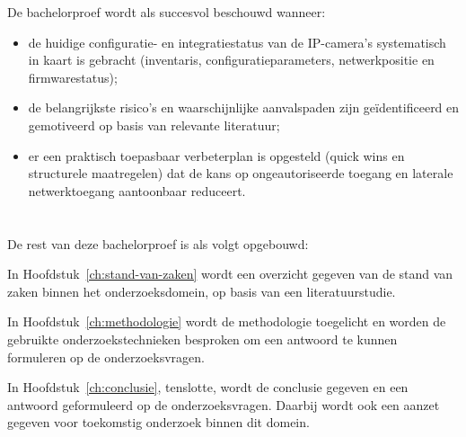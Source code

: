 De bachelorproef wordt als succesvol beschouwd wanneer:
\begin{itemize}
    \item de huidige configuratie- en integratiestatus van de IP-camera’s systematisch in kaart is gebracht (inventaris, configuratieparameters, netwerkpositie en firmwarestatus);
    \item de belangrijkste risico’s en waarschijnlijke aanvalspaden zijn geïdentificeerd en gemotiveerd op basis van relevante literatuur;
    \item er een praktisch toepasbaar verbeterplan is opgesteld (quick wins en structurele maatregelen) dat de kans op ongeautoriseerde toegang en laterale netwerktoegang aantoonbaar reduceert.
\end{itemize}

\section{}%
\label{sec:opzet-bachelorproef}

De rest van deze bachelorproef is als volgt opgebouwd:

In Hoofdstuk~\ref{ch:stand-van-zaken} wordt een overzicht gegeven van de stand van zaken binnen het onderzoeksdomein, op basis van een literatuurstudie.

In Hoofdstuk~\ref{ch:methodologie} wordt de methodologie toegelicht en worden de gebruikte onderzoekstechnieken besproken om een antwoord te kunnen formuleren op de onderzoeksvragen.

In Hoofdstuk~\ref{ch:conclusie}, tenslotte, wordt de conclusie gegeven en een antwoord geformuleerd op de onderzoeksvragen. Daarbij wordt ook een aanzet gegeven voor toekomstig onderzoek binnen dit domein.